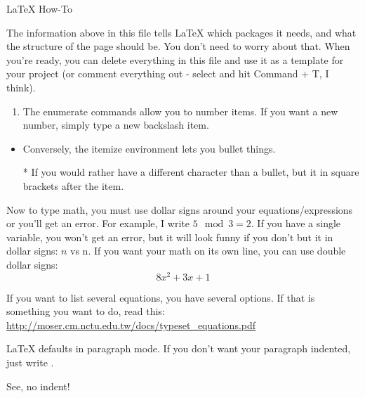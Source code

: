 \documentclass{article}
\begin{document}
\begin{center}
\Large{LaTeX How-To}
\end{center}
The information above in this file tells LaTeX which packages it needs, and what the structure of the page should be.  You don't need to worry about that.  When you're ready, you can delete everything in this file and use it as a template for your project (or comment everything out - select and hit Command + T, I think).

\begin{enumerate}
\item The enumerate commands allow you to number items.  If you want a new number, simply type 
a new backslash item.
\end{enumerate}

\begin{itemize}
\item Conversely, the itemize environment lets you bullet things.  
\item[*] If you would rather have a different character than a bullet, but it in square brackets after the item.
\end{itemize}

Now to type math, you must use dollar signs around your equations/expressions or you'll get an error.  For example, I write $5 \mod 3 = 2$.  If you have a single variable, you won't get an error, but it will look funny if you don't but it in dollar signs: $n$ vs n.  If you want your math on its own line, you can use double dollar signs: $$8x^2 + 3x + 1$$

If you want to list several equations, you have several options.  If that is something you want to do, read this: \url{http://moser.cm.nctu.edu.tw/docs/typeset_equations.pdf}

LaTeX defaults in paragraph mode.  If you don't want your paragraph indented, just write \noindent.

\noindent See, no indent!
\end{document}
